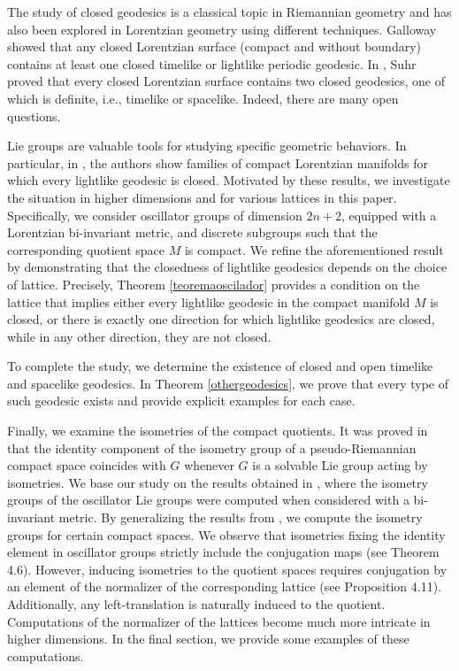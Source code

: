 \documentclass[12pt]{amsart}
\theoremstyle{plain}
\theoremstyle{definition}
\theoremstyle{remark}
\begin{document}
The study of closed geodesics is a classical topic in Riemannian geometry and has also been explored in Lorentzian geometry using different techniques. Galloway \cite{Ga} showed that any closed Lorentzian surface (compact and without boundary) contains at least one closed timelike or lightlike periodic geodesic. In \cite{Su}, Suhr proved that every closed Lorentzian surface contains two closed geodesics, one of which is definite, i.e., timelike or spacelike. Indeed, there are many open questions.

Lie groups are valuable tools for studying specific geometric behaviors. In particular, in \cite{BOV}, the authors show families of compact Lorentzian manifolds for which every lightlike geodesic is closed. Motivated by these results, we investigate the situation in higher dimensions and for various lattices in this paper. Specifically, we consider oscillator groups of dimension $2n+2$, equipped with a Lorentzian bi-invariant metric, and discrete subgroups such that the corresponding quotient space $M$ is compact. We refine the aforementioned result by demonstrating that the closedness of lightlike geodesics depends on the choice of lattice. Precisely, Theorem \ref{teoremaoscilador} provides a condition on the lattice that implies either every lightlike geodesic in the compact manifold $M$ is closed, or there is exactly one direction for which lightlike geodesics are closed, while in any other direction, they are not closed.

To complete the study, we determine the existence of closed and open timelike and spacelike geodesics. In Theorem \ref{othergeodesics}, we prove that every type of such geodesic exists and provide explicit examples for each case.

Finally, we examine the isometries of the compact quotients. It was proved in \cite{BG} that the identity component of the isometry group of a pseudo-Riemannian compact space coincides with $G$ whenever $G$ is a solvable Lie group acting by isometries. We base our study on the results obtained in \cite{Bou}, where the isometry groups of the oscillator Lie groups were computed when considered with a bi-invariant metric. By generalizing the results from \cite{BOV}, we compute the isometry groups for certain compact spaces. We observe that isometries fixing the identity element in oscillator groups strictly include the conjugation maps (see Theorem 4.6). However, inducing isometries to the quotient spaces requires conjugation by an element of the normalizer of the corresponding lattice (see Proposition 4.11). Additionally, any left-translation is naturally induced to the quotient. Computations of the normalizer of the lattices become much more intricate in higher dimensions. In the final section, we provide some examples of these computations.
\end{document}
